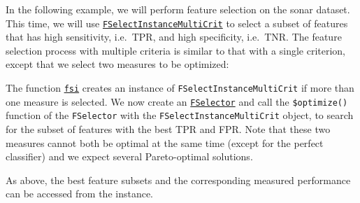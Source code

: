 In the following example, we will perform feature selection on the sonar
dataset. This time, we will use
\href{https://mlr3fselect.mlr-org.com/reference/FSelectInstanceMultiCrit.html}{\texttt{FSelectInstanceMultiCrit}}
to select a subset of features that has high sensitivity, i.e.~TPR, and
high specificity, i.e.~TNR. The feature selection process with multiple
criteria is similar to that with a single criterion, except that we
select two measures to be optimized:

\begin{Shaded}
\begin{Highlighting}[]
\OtherTok{=} \NormalTok{(}
   \NormalTok{(}\NormalTok{),}
   \NormalTok{(}\NormalTok{),}
   \NormalTok{(}\NormalTok{(}\NormalTok{, }\NormalTok{)),}
   \NormalTok{(}\NormalTok{, } \NormalTok{)}
\NormalTok{)}
\end{Highlighting}
\end{Shaded}

The function
\href{https://mlr3fselect.mlr-org.com/reference/fsi.html}{\texttt{fsi}}
creates an instance of \texttt{FSelectInstanceMultiCrit} if more than
one measure is selected. We now create an
\href{https://mlr3fselect.mlr-org.com/reference/FSelector.html}{\texttt{FSelector}}
and call the \texttt{\$optimize()} function of the \texttt{FSelector}
with the \texttt{FSelectInstanceMultiCrit} object, to search for the
subset of features with the best TPR and FPR. Note that these two
measures cannot both be optimal at the same time (except for the perfect
classifier) and we expect several Pareto-optimal solutions.

\begin{Shaded}
\begin{Highlighting}[]
\OtherTok{=} \NormalTok{(}\NormalTok{)}
\SpecialCharTok{$}
\end{Highlighting}
\end{Shaded}

As above, the best feature subsets and the corresponding measured
performance can be accessed from the instance.

